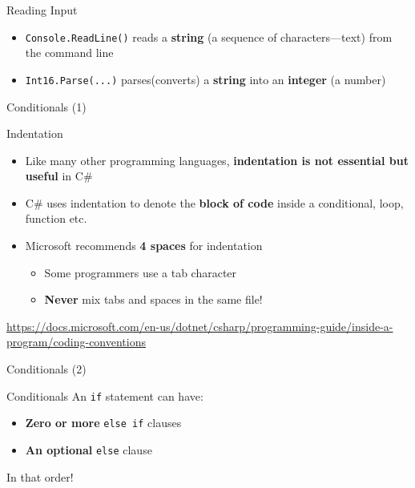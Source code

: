 \begin{frame}{Reading Input}

\begin{itemize}
\item \lstinline{Console.ReadLine()} reads a \textbf{string} (a sequence of characters---text) from the command line
\item \lstinline{Int16.Parse(...)} parses(converts) a \textbf{string} into an \textbf{integer} (a number)
\end{itemize}
\end{frame}

\begin{frame}{Conditionals (1)}
\end{frame}

\begin{frame}{Indentation}
\begin{itemize}
\item Like many other programming languages, \textbf{indentation is not essential but useful} in C\#
\item C\# uses indentation to denote the \textbf{block of code} inside a conditional, loop, function etc.
\item Microsoft recommends \textbf{4 spaces} for indentation
\begin{itemize}
\item Some programmers use a tab character
\item \textbf{Never} mix tabs and spaces in the same file!
\end{itemize}
\end{itemize}

\scriptsize\url{https://docs.microsoft.com/en-us/dotnet/csharp/programming-guide/inside-a-program/coding-conventions}
\end{frame}

\begin{frame}{Conditionals (2)}
\end{frame}

\begin{frame}{Conditionals}
 An \lstinline{if} statement can have:
\begin{itemize}
\item \textbf{Zero or more} \lstinline{else if} clauses
\item \textbf{An optional} \lstinline{else} clause
\end{itemize}
 In that order!
\end{frame}

